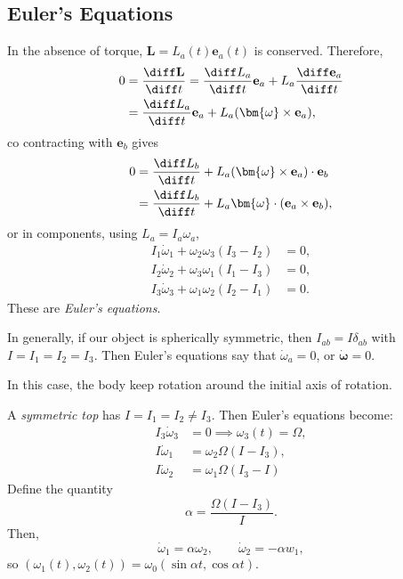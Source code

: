 \documentclass[12pt]{article}
\begin{document}
\subsection{Euler's Equations}
\label{sub:e_eq}

In the absence of torque, $\mathbf{L} = L_a(t) \mathbf{e}_a(t)$ is conserved. Therefore,
\begin{align*}
	0 &= \frac{\diff \mathbf{L}}{\diff t} = \frac{\diff L_a}{\diff t} \mathbf{e}_a + L_a \frac{\diff \mathbf{e}_a}{\diff t} \\
	  &= \frac{\diff L_a}{\diff t} \mathbf{e}_a + L_a(\bm{\omega} \times \mathbf{e}_a),
\end{align*}
co contracting with $\mathbf{e}_b$ gives
\begin{align*}
	0 &= \frac{\diff L_b}{\diff t} + L_a(\bm{\omega} \times \mathbf{e}_a)\cdot \mathbf{e}_b \\
	  &= \frac{\diff L_b}{\diff t} + L_a \bm{\omega} \cdot (\mathbf{e}_a \times \mathbf{e}_b),
\end{align*}
or in components, using $L_a = I_a \omega_a$,
\begin{align*}
	I_1 \dot \omega_1 + \omega_2 \omega_3(I_3 - I_2) &= 0,\\
	I_2 \dot \omega_2 + \omega_3 \omega_1(I_1 - I_3) &= 0,\\
	I_3 \dot \omega_3 + \omega_1 \omega_2(I_2 - I_1) &= 0.
\end{align*}
These are \emph{Euler's equations}.

In generally, if our object is spherically symmetric, then $I_{ab} = I \delta_{ab}$ with $I = I_1 = I_2 = I_3$. Then Euler's equations say that $\dot \omega_a = 0$, or $\bm{\dot \omega} = 0$.

In this case, the body keep rotation around the initial axis of rotation.

A \emph{symmetric top} has $I = I_1 = I_2 \neq I_3$. Then Euler's equations become:
\begin{align*}
	I_3 \dot \omega_3 &= 0 \implies \omega_3(t) = \Omega, \\
	I \dot \omega_1 &= \omega_2 \Omega (I - I_3),\\
	I \dot \omega_2 &= \omega_1 \Omega (I_3 - I)
\end{align*}
Define the quantity
\[
\alpha = \frac{\Omega(I - I_3)}{I}.
\]
Then,
\[
\dot \omega_1 = \alpha \omega_2, \qquad \dot \omega_2 = - \alpha w_1,
\]
so $(\omega_1(t), \omega_2(t)) = \omega_0 (\sin \alpha t, \cos \alpha t)$.
\end{document}

